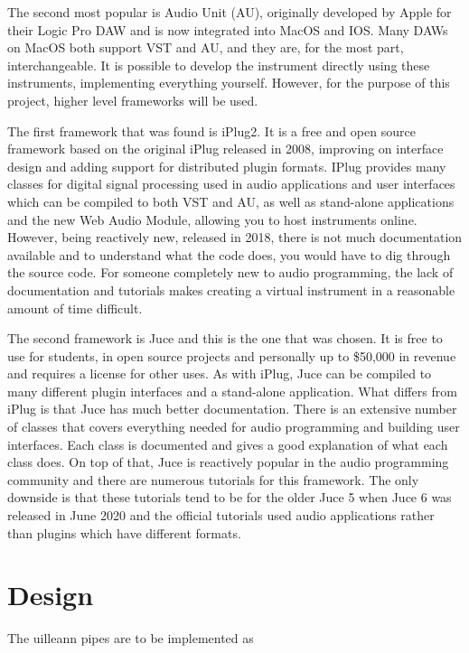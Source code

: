 \documentclass[12pt]{article}
\begin{document}
	The second most popular is Audio Unit (AU), originally developed by Apple for their Logic Pro DAW and is now integrated into MacOS and IOS. 
	Many DAWs on MacOS both support VST and AU, and they are, for the most part, interchangeable. 
	It is possible to develop the instrument directly using these instruments, implementing everything yourself. However, for the purpose of this project, 
	higher level frameworks will be used.
	
	The first framework that was found is iPlug2. It is a free and open source framework based on the original iPlug released in 2008, improving on interface design 
	and adding support for distributed plugin formats. IPlug provides many classes for digital signal processing used in audio applications and user interfaces which can be
	compiled to both VST and AU, as well as stand-alone applications and the new Web Audio Module, allowing you to host instruments online.
	However, being reactively new, released in 2018, there is not much documentation available and to understand what the code does, you would have to dig through the source code.
	For someone completely new to audio programming, the lack of documentation and tutorials makes creating a virtual instrument in a reasonable amount of time difficult.
	
	The second framework is Juce and this is the one that was chosen. It is free to use for students, in open source projects and personally up to \$50,000 in revenue and 
	requires a license for other uses.
	As with iPlug, Juce can be compiled to many different plugin interfaces and a stand-alone application. What differs from iPlug is that Juce has much better documentation.
	There is an extensive number of classes that covers everything needed for audio programming and building user interfaces. 
	Each class is documented and gives a good explanation of what each class does. On top of that, Juce is reactively popular in the audio programming community and there
	are numerous tutorials for this framework. The only downside is that these tutorials tend to be for the older Juce 5 when Juce 6 was released in June 2020 and the official
	tutorials used audio applications rather than plugins which have different formats.
	

	
\section{Design}
	
	The uilleann pipes are to be implemented as
	
\end{document}
